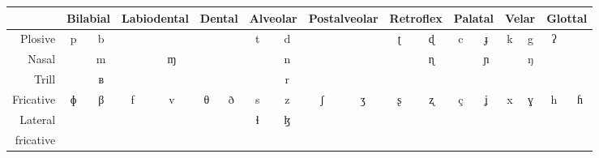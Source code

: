 \documentclass[oneside]{book}
\begin{document}
\begin{center}
\newcommand{\head}{\fontsize{7pt}{7pt}\selectfont}
\begin{tabular}{|r|cc|cc|cccccc|cc|cc|cc|cc|}\hline
&
\multicolumn{2}{|c|}{\head Bilabial}&
\multicolumn{2}{|c|}{\head Labiodental}&
\multicolumn{2}{|c|}{\head Dental}&
\multicolumn{2}{|c|}{\head Alveolar}&
\multicolumn{2}{|c|}{\head Postalveolar}&
\multicolumn{2}{|c|}{\head Retroflex}&
\multicolumn{2}{|c|}{\head Palatal}&
\multicolumn{2}{|c|}{\head Velar}&
\multicolumn{2}{|c|}{\head Glottal}\\\hline
\multirow{2}{*}{\head Plosive}&
\multirow{2}{*}{p}&
\multirow{2}{*}{b}&
&
&
&
&
\multirow{2}{*}{t}&
\multirow{2}{*}{d}&
&
&
\multirow{2}{*}{ʈ}&
\multirow{2}{*}{ɖ}&
\multirow{2}{*}{c}&
\multirow{2}{*}{ɟ}&
\multirow{2}{*}{k}&
\multirow{2}{*}{g}&
\multirow{2}{*}{ʔ}&
\cellcolor{gray}\\
&&&&&&&&&&&&&&&&&&\cellcolor{gray}\\\hline
\multirow{2}{*}{\head Nasal}&
&
\multirow{2}{*}{m}&
&
\multirow{2}{*}{ɱ}&
&
&
&
\multirow{2}{*}{n}&
&
&
&
\multirow{2}{*}{ɳ}&
&
\multirow{2}{*}{ɲ}&
&
\multirow{2}{*}{ŋ}&
\cellcolor{gray}&
\cellcolor{gray}\\
&&&&&&&&&&&&&&&&&\cellcolor{gray}&\cellcolor{gray}\\\hline
\multirow{2}{*}{\head Trill}&
&
\multirow{2}{*}{ʙ}&
&
&
&
&
&
\multirow{2}{*}{r}&
&
&
&
&
&
&
\cellcolor{gray}&
\cellcolor{gray}&
\cellcolor{gray}&
\cellcolor{gray}\\
&&&&&&&&&&&&&&&\cellcolor{gray}&\cellcolor{gray}&\cellcolor{gray}&\cellcolor{gray}\\\hline
\multirow{2}{*}{\head Fricative}&
\multirow{2}{*}{ɸ}&
\multirow{2}{*}{β}&
\multirow{2}{*}{f}&
\multirow{2}{*}{v}&
\multirow{2}{*}{θ}&
\multicolumn{1}{c|}{\multirow{2}{*}{ð}}&
\multicolumn{1}{c}{\multirow{2}{*}{s}}&
\multicolumn{1}{c|}{\multirow{2}{*}{z}}&
\multicolumn{1}{|c}{\multirow{2}{*}{ʃ}}&
\multirow{2}{*}{ʒ}&
\multirow{2}{*}{ʂ}&
\multirow{2}{*}{ʐ}&
\multirow{2}{*}{ç}&
\multirow{2}{*}{ʝ}&
\multirow{2}{*}{x}&
\multirow{2}{*}{ɣ}&
\multirow{2}{*}{h}&
\multirow{2}{*}{ɦ}\\
&&&&&\multicolumn{2}{c|}{}&\multicolumn{2}{c|}{}&\multicolumn{2}{|c|}{}&&&&&&&&\\\hline
{\head Lateral}&
\cellcolor{gray}&
\cellcolor{gray}&
\cellcolor{gray}&
\cellcolor{gray}&
&
&
\multirow{2}{*}{ɬ}&
\multirow{2}{*}{ɮ}&
&
&
&
&
&
&
&
&
\cellcolor{gray}&
\cellcolor{gray}\\
{\head fricative}&\cellcolor{gray}&\cellcolor{gray}&\cellcolor{gray}&\cellcolor{gray}&&&&&&&&&&&&&\cellcolor{gray}&\cellcolor{gray}\\\hline

\end{tabular}
\end{center}
\end{document}
